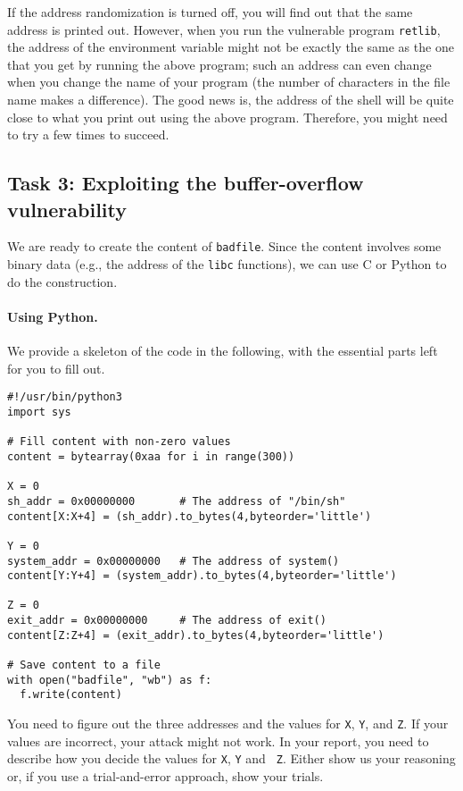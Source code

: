 If the address randomization is turned off, you will find out that the same 
address is printed out. However, when you run the 
vulnerable program \texttt{retlib}, the address of the environment
variable might not be exactly the same as the one that you get by running 
the above program; such an address can even change when you change
the name of your program (the number of characters in the file
name makes a difference). The good news is, the address of the shell will
be quite close to what you print out using the above program. Therefore,
you might need to try a few times to succeed.



\subsection{Task 3: Exploiting the buffer-overflow vulnerability} 

We are ready to create the content of \texttt{badfile}. Since 
the content involves some binary data (e.g., the address of the 
\texttt{libc} functions), we can use C or Python to do the construction.  


\paragraph{Using Python.}
We provide a skeleton of the code in the following, with the essential 
parts left for you to fill out.


\begin{lstlisting}
#!/usr/bin/python3
import sys

# Fill content with non-zero values
content = bytearray(0xaa for i in range(300))

X = 0
sh_addr = 0x00000000       # The address of "/bin/sh"
content[X:X+4] = (sh_addr).to_bytes(4,byteorder='little')

Y = 0
system_addr = 0x00000000   # The address of system()
content[Y:Y+4] = (system_addr).to_bytes(4,byteorder='little')

Z = 0
exit_addr = 0x00000000     # The address of exit()
content[Z:Z+4] = (exit_addr).to_bytes(4,byteorder='little')

# Save content to a file
with open("badfile", "wb") as f:
  f.write(content)
\end{lstlisting}
 
You need to figure out the three addresses and the values for 
\texttt{X}, \texttt{Y}, and \texttt{Z}. 
If your values are incorrect,
your attack might not work. In your report, you need to
describe how you decide the values for {\tt X}, {\tt Y} and {\tt
Z}. Either show us your reasoning or, if you use a trial-and-error approach,
show your trials.



